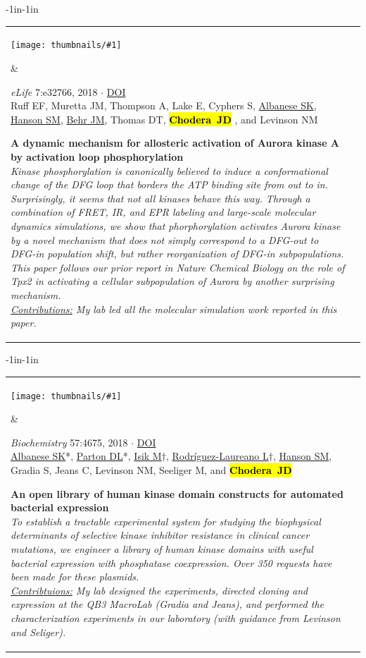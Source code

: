 \documentclass[10pt]{article}
\newcommand{\newarticle}[7]{
\begin{adjustwidth}{-1in}{-1in}  
\begin{tabular}{p{0.9in}p{7in}}
\parbox[c]{0.9in}{\texttt{[image: thumbnails/\#1]}} & \parbox[c]{6in}{\setstretch{0.9} {\small #4} $\cdot$ \href{#6}{#5} \\ {\footnotesize {#2}} \\ \raggedright { \bf\nohyphens{#3}}  \\ {\footnotesize\emph {#7}}} %
\end{tabular}
\end{adjustwidth}
\vspace{0.2in}
}
\newcommand{\jdc}{ {\bf \hl{Chodera~JD}} } %
\begin{document}
\newarticle{aurka-phosphorylation}{Ruff EF, Muretta JM, Thompson A, Lake E, Cyphers S, \underline{Albanese SK}, \underline{Hanson SM}, \underline{Behr JM}, Thomas DT, \jdc, and Levinson NM}{A dynamic mechanism for allosteric activation of Aurora kinase A by activation loop phosphorylation}{\emph{eLife} 7:e32766, 2018}{DOI}{https://doi.org/10.7554/eLife.32766}{Kinase phosphorylation is canonically believed to induce a conformational change of the DFG loop that borders the ATP binding site from out to in. Surprisingly, it seems that not all kinases behave this way. Through a combination of FRET, IR, and EPR labeling and large-scale molecular dynamics simulations, we show that phorphorylation activates Aurora kinase by a novel mechanism that does not simply correspond to a DFG-out to DFG-in population shift, but rather reorganization of DFG-in subpopulations. This paper follows our prior report in \emph{Nature Chemical Biology} on the role of Tpx2 in activating a cellular subpopulation of Aurora by another surprising mechanism.\\
\underline{Contributions:} My lab led all the molecular simulation work reported in this paper.
}


\newarticle{kinome-expression-tree}{\underline{Albanese SK}*, \underline{Parton DL}*, \underline{Isik M}$\dag$, \underline{Rodr\'{i}guez-Laureano L}$\dag$, \underline{Hanson SM}, Gradia S, Jeans C, Levinson NM, Seeliger M, and \jdc}{An open library of human kinase domain constructs for automated bacterial expression}{\emph{Biochemistry} 57:4675, 2018}{DOI}{http://doi.org/10.1021/acs.biochem.7b01081}{To establish a tractable experimental system for studying the biophysical determinants of selective kinase inhibitor resistance in clinical cancer mutations, we engineer a library of human kinase domains with useful bacterial expression with phosphatase coexpression. Over 350 requests have been made for these plasmids.\\
\underline{Contribtuions:} My lab designed the experiments, directed cloning and expression at the QB3 MacroLab (Gradia and Jeans), and performed the characterization experiments in our laboratory (with guidance from Levinson and Seliger).
}
\end{document}
